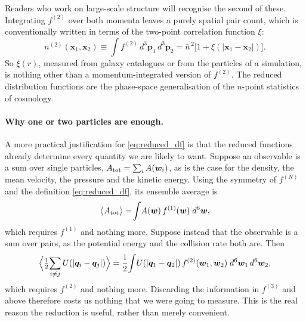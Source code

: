 \documentclass[12pt]{article}
\renewcommand{\vec}[1]{\bm{#1}}
\begin{document}
Readers who work on large-scale structure will recognise the second of
these.  Integrating $f^{(2)}$ over both momenta leaves a purely spatial
pair count, which is conventionally written in terms of the two-point
correlation function $\xi$:
%
\begin{equation}
  n^{(2)}(\vec x_1,\vec x_2) \equiv \!\int\! f^{(2)}\,d^3\vec p_1\,d^3\vec p_2
    = \bar n^{\,2}\bigl[1 + \xi(|\vec x_1 - \vec x_2|)\bigr].
  \label{eq:f2_xi}
\end{equation}
%
So $\xi(r)$, measured from galaxy catalogues or from the particles of a
simulation, is nothing other than a momentum-integrated version of
$f^{(2)}$.  The reduced distribution functions are the phase-space
generalisation of the $n$-point statistics of cosmology.

\paragraph{Why one or two particles are enough.}  A more practical
justification for \eqref{eq:reduced_df} is that the reduced functions
already determine every quantity we are likely to want.  Suppose an
observable is a sum over single particles,
$A_{\rm tot} = \sum_{i} A(\vec w_i)$, as is the case for the density,
the mean velocity, the pressure and the kinetic energy.  Using the
symmetry of $f^{(N)}$ and the definition \eqref{eq:reduced_df}, its
ensemble average is
%
\begin{equation}
  \bigl\langle A_{\rm tot}\bigr\rangle
   = \!\int\! A(\vec w)\,f^{(1)}(\vec w)\;d^6\vec w ,
  \label{eq:onebody_average}
\end{equation}
%
which requires $f^{(1)}$ and nothing more.  Suppose instead that the
observable is a sum over pairs, as the potential energy and the
collision rate both are.  Then
%
\begin{equation}
  \Bigl\langle \tfrac12\!\sum_{i\neq j} U(|\vec q_i-\vec q_j|)\Bigr\rangle
   = \frac12\!\int\! U(|\vec q_1-\vec q_2|)\,
       f^{(2)}(\vec w_1,\vec w_2)\;d^6\vec w_1\,d^6\vec w_2 ,
  \label{eq:twobody_average}
\end{equation}
%
which requires $f^{(2)}$ and nothing more.  Discarding the information
in $f^{(3)}$ and above therefore costs us nothing that we were going to
measure.  This is the real reason the reduction is useful, rather than
merely convenient.
\end{document}
